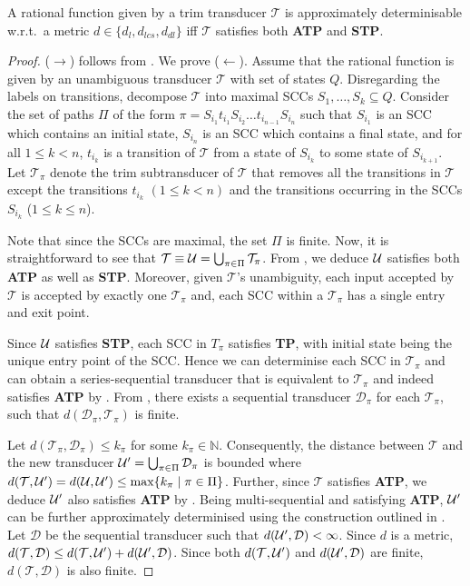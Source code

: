\documentclass[a4paper,UKenglish,cleveref, autoref, thm-restate,authorcolumns, colorlinks]{lipics-v2021}
\newcommand\calD{\mathcal{D}}
\newcommand\calT{\mathcal{T}}
\newcommand{\TP}[0]{\textbf{TP}}
\newcommand{\ATP}[0]{\textbf{ATP}}
\newcommand{\STP}[0]{\textbf{STP}}
\begin{document}
{\begin{lemma}\label{theorem:approxdetlev}

    A rational function given by a trim transducer $\calT$ is approximately determinisable w.r.t.~a metric $d \in \{d_l,d_{lcs},d_{dl}\}$ iff $\calT$ satisfies both \ATP{} and \STP{}.
\end{lemma}

\begin{proof}
    ($\rightarrow$) follows from . We prove ($\leftarrow$). Assume that the rational function is given by an unambiguous transducer $\calT$ with set of states $Q$. Disregarding the labels on transitions, decompose $\calT$ into maximal SCCs $S_1,\dots,S_k\subseteq Q$.
    Consider the set of paths $\Pi$ of the form $\pi = S_{i_1}t_{i_1}S_{i_2}\dots t_{i_{n-1}}S_{i_n}$ such that $S_{i_1}$ is an SCC which contains an initial state, $S_{i_n}$ is an SCC which contains a final state, and for all $1\leq k<n$, $t_{i_k}$ is a transition of $\calT$ from a state of $S_{i_k}$ to some state of $S_{i_{k+1}}$. Let $\calT_\pi$ denote the trim subtransducer of $\calT$ that removes all the transitions in $\calT$ except the transitions $t_{i_k}$ $(1\leq k<n)$ and the transitions occurring in the SCCs $S_{i_k}$ ($1\leq k\leq n$).

      
      Note that since the SCCs are maximal, the set $\Pi$ is finite. 
    Now, it is straightforward to see that $\calT \equiv {\cal U}= \bigcup_{\pi \in \Pi} \calT_\pi$. From , we deduce ${\cal U}$ satisfies both \ATP{} as well as \STP{}. Moreover, given $\calT$'s unambiguity, each input accepted by $\calT$ is accepted by exactly one $\calT_\pi$ and, each SCC within a $\calT_\pi$ has a single entry and exit point.

    Since ${\cal U}$ satisfies \STP{}, each SCC in $T_\pi$ satisfies \TP{}, with initial state being the unique entry point of the SCC. Hence we can determinise each SCC in $\calT_\pi$ and can obtain a series-sequential transducer that is equivalent to $\calT_\pi$ and indeed satisfies \ATP{} by . From , there exists a sequential transducer $\calD_\pi$ for each $\calT_\pi$, such that $d(\calD_\pi,\calT_\pi)$ is finite. 
    
    Let $d(\calT_\pi,\calD_\pi) \leq k_\pi$ for some $k_\pi \in \mathbb{N}$. Consequently, the distance between $\calT$ and the new transducer ${\cal U'} = \bigcup_{\pi\in \Pi} \calD_\pi$ is bounded where $d(\calT,{\cal U'}) = d({\cal U},{\cal U'}) \leq \max \{ k_\pi \mid \pi\in \Pi\}$. Further, since $\calT$ satisfies \ATP{}, we deduce ${\cal U'}$ also satisfies \ATP{} by . Being multi-sequential and satisfying \ATP{}, ${\cal U'}$ can be further approximately determinised using the construction outlined in . Let $\calD$ be the sequential transducer such that $d({\cal U'},\calD) < \infty$. Since $d$ is a metric,
    $d(\calT,\calD) \leq d(\calT,{\cal U'}) + d({\cal U'},\calD)$. Since both $d(\calT,{\cal U'})$ and $d({\cal U'},\calD)$ are finite, $d(\calT,\calD)$ is also finite. \qedhere


\end{proof}}
\end{document}
